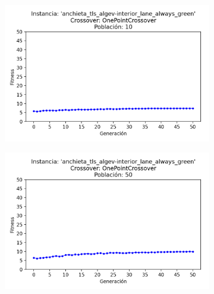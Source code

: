 \begin{figure}[h]
    \centering
    \begin{subfigure}[t]{.49\textwidth}
      \centering
      \includegraphics[width=\textwidth]{report/images/estudio/anchieta_tls_algev-interior_lane_always_green-OnePointCrossover-10.png}
    \end{subfigure}
    \hfill
    \begin{subfigure}[t]{.49\textwidth}
      \centering
      \includegraphics[width=\textwidth]{report/images/estudio/anchieta_tls_algev-interior_lane_always_green-OnePointCrossover-50.png}
    \end{subfigure}
    \vspace{0.7cm}
    \begin{subfigure}[t]{.49\textwidth}
      \centering

\end{subfigure}
\end{figure}
